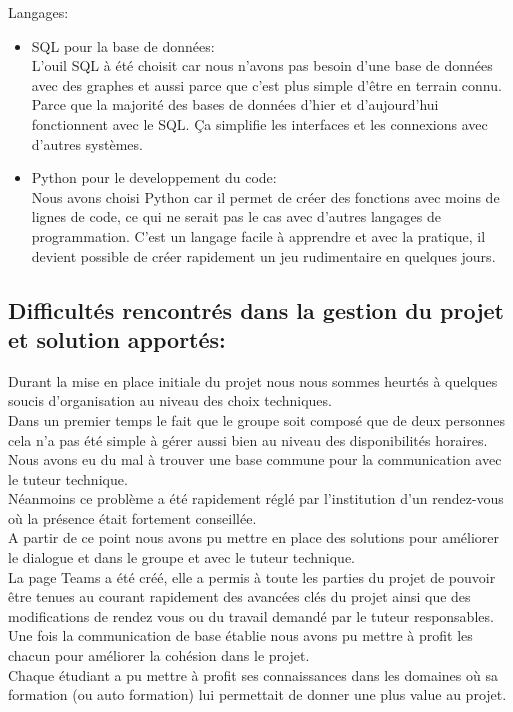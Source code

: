 \documentclass[11pt, report, french]{scrreprt}
\begin{document}
	Langages:
	\begin{itemize}
		\item SQL pour la base de données:\\
		L'ouil SQL à été choisit car nous n'avons pas besoin d'une base de données avec des graphes et aussi parce que c'est plus simple d'être en terrain connu. Parce que la majorité des bases de données d'hier et d'aujourd'hui fonctionnent avec le SQL. Ça simplifie les interfaces et les connexions avec d'autres systèmes.
		\item Python pour le developpement du code:\\
		Nous avons choisi Python car il permet de créer des fonctions avec moins de lignes de code, ce qui ne serait pas le cas avec d'autres langages de programmation. C'est un langage facile à apprendre et avec la pratique, il devient possible de créer rapidement un jeu rudimentaire en quelques jours.
	\end{itemize}

	\subsection{Difficultés rencontrés dans la gestion du projet et solution apportés:}
	Durant la mise en place initiale du projet nous nous sommes heurtés à quelques soucis d’organisation au niveau des choix techniques.\\
	Dans un premier temps le fait que le groupe soit composé que de deux personnes cela n’a pas été simple à gérer aussi bien au niveau des disponibilités horaires.
	Nous avons eu du mal à trouver une base commune pour la communication avec le tuteur technique.\\
	Néanmoins ce problème a été rapidement réglé par l’institution d’un rendez-vous où la présence était fortement conseillée.\\
	A partir de ce point nous avons pu mettre en place des solutions pour améliorer le dialogue et dans le groupe et avec le tuteur technique.\\
	La page Teams a été créé, elle a permis à toute les parties du projet de pouvoir être tenues au courant rapidement des avancées clés du projet ainsi
	que des modifications de rendez vous ou du travail demandé par le tuteur responsables.\\
	Une fois la communication de base établie nous avons pu mettre à profit les
	chacun pour améliorer la cohésion dans le projet.\\
	Chaque étudiant a pu mettre à profit ses connaissances dans les domaines où
	sa formation (ou auto formation) lui permettait de donner une plus value au
	projet.\\
	
\end{document}
